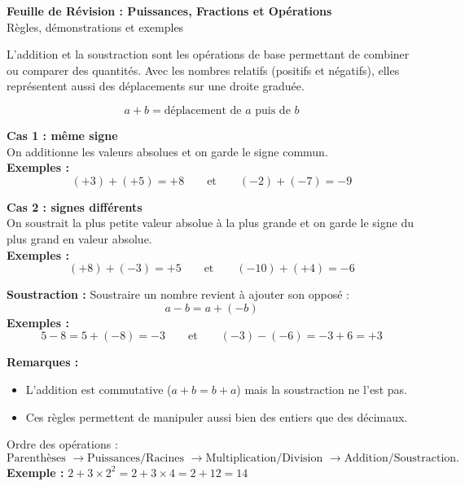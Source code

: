 \documentclass[11pt,a4paper]{article}
\newcommand{\rulebox}[3]{
\begin{tcolorbox}[colback=#1!10!white,colframe=#1!60!black,title=\textbf{#2}]
#3
\end{tcolorbox}
}
\begin{document}
\begin{center}
{\LARGE \textbf{Feuille de Révision : Puissances, Fractions et Opérations}}\\[0.5cm]
{\large Règles, démonstrations et exemples}
\end{center}

\rulebox{green}{Addition et soustraction de nombres relatifs}{
L’addition et la soustraction sont les opérations de base permettant de combiner ou comparer des quantités.  
Avec les nombres relatifs (positifs et négatifs), elles représentent aussi des déplacements sur une droite graduée.

\[
a + b = \text{déplacement de } a \text{ puis de } b
\]

\textbf{Cas 1 : même signe} \\
On additionne les valeurs absolues et on garde le signe commun.\\[0.2cm]
\textbf{Exemples :}
\[
(+3)+(+5)=+8 \qquad \text{et} \qquad (-2)+(-7)=-9
\]

\textbf{Cas 2 : signes différents} \\
On soustrait la plus petite valeur absolue à la plus grande et on garde le signe du plus grand en valeur absolue.\\[0.2cm]
\textbf{Exemples :}
\[
(+8)+(-3)=+5 \qquad \text{et} \qquad (-10)+(+4)=-6
\]

\textbf{Soustraction :}  
Soustraire un nombre revient à ajouter son opposé :
\[
a - b = a + (-b)
\]
\textbf{Exemples :}
\[
5 - 8 = 5 + (-8) = -3 \qquad \text{et} \qquad (-3) - (-6) = -3 + 6 = +3
\]

\textbf{Remarques :}
\begin{itemize}
\item L’addition est commutative ($a+b=b+a$) mais la soustraction ne l’est pas.  
\item Ces règles permettent de manipuler aussi bien des entiers que des décimaux.  
\end{itemize}
}

\rulebox{gray}{Priorité et parenthèses}{
Ordre des opérations :
\[
\text{Parenthèses } \to \text{Puissances/Racines } \to \text{Multiplication/Division } \to \text{Addition/Soustraction.}
\]
\textbf{Exemple : } $2 + 3 \times 2^2 = 2 + 3 \times 4 = 2 + 12 = 14$
}
\end{document}
